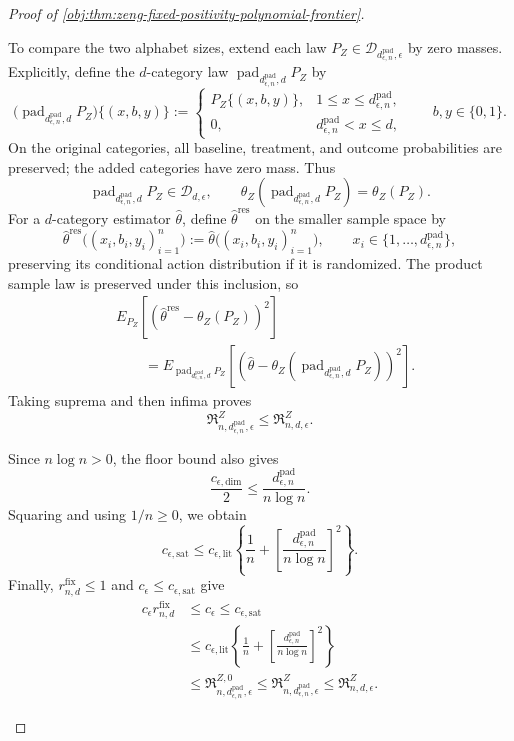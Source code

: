\documentclass[11pt]{article}
\begin{document}
\begin{proof}[Proof of \cref{obj:thm:zeng-fixed-positivity-polynomial-frontier}]
\begin{enumerate}
To compare the two alphabet sizes, extend each law
\(P_Z\in\mathcal D_{d_{\epsilon,n}^{\mathrm{pad}},\epsilon}\)
by zero masses. Explicitly, define the \(d\)-category law
\(\operatorname{pad}_{d_{\epsilon,n}^{\mathrm{pad}},d}P_Z\) by
\[
\bigl(\operatorname{pad}_{d_{\epsilon,n}^{\mathrm{pad}},d}P_Z\bigr)
\{(x,b,y)\}
:=
\begin{cases}
P_Z\{(x,b,y)\},&1\le x\le d_{\epsilon,n}^{\mathrm{pad}},\\
0,&d_{\epsilon,n}^{\mathrm{pad}}<x\le d,
\end{cases}
\qquad b,y\in\{0,1\}.
\]
On the original categories, all baseline, treatment, and outcome
probabilities are preserved; the added categories have zero mass.
Thus
\[
\operatorname{pad}_{d_{\epsilon,n}^{\mathrm{pad}},d}P_Z
\in\mathcal D_{d,\epsilon},
\qquad
\theta_Z\!\left(
\operatorname{pad}_{d_{\epsilon,n}^{\mathrm{pad}},d}P_Z
\right)
=\theta_Z(P_Z).
\]
For a \(d\)-category estimator \(\widehat\theta\), define
\(\widehat\theta^{\mathrm{res}}\) on the smaller sample space by
\[
\widehat\theta^{\mathrm{res}}
\bigl((x_i,b_i,y_i)_{i=1}^n\bigr)
:=
\widehat\theta
\bigl((x_i,b_i,y_i)_{i=1}^n\bigr),
\qquad
x_i\in\{1,\ldots,d_{\epsilon,n}^{\mathrm{pad}}\},
\]
preserving its conditional action distribution if it is randomized.
The product sample law is preserved under this inclusion, so
\[
\begin{split}
&E_{P_Z}\!\left[
\left(\widehat\theta^{\mathrm{res}}-\theta_Z(P_Z)\right)^2
\right]\\
&\qquad=
E_{\operatorname{pad}_{d_{\epsilon,n}^{\mathrm{pad}},d}P_Z}
\!\left[
\left(
\widehat\theta-
\theta_Z\!\left(
\operatorname{pad}_{d_{\epsilon,n}^{\mathrm{pad}},d}P_Z
\right)
\right)^2
\right].
\end{split}
\]
Taking suprema and then infima proves
\[
\mathfrak R^Z_{n,d_{\epsilon,n}^{\mathrm{pad}},\epsilon}
\le
\mathfrak R^Z_{n,d,\epsilon}.
\]

Since \(n\log n>0\), the floor bound also gives
\[
\frac{c_{\epsilon,\mathrm{dim}}}{2}
\le
\frac{d_{\epsilon,n}^{\mathrm{pad}}}{n\log n}.
\]
Squaring and using \(1/n\ge0\), we obtain
\[
c_{\epsilon,\mathrm{sat}}
\le
c_{\epsilon,\mathrm{lit}}
\left\{
\frac1n+
\left[
\frac{d_{\epsilon,n}^{\mathrm{pad}}}{n\log n}
\right]^2
\right\}.
\]
Finally, \(r^{\mathrm{fix}}_{n,d}\le1\) and
\(c_\epsilon\le c_{\epsilon,\mathrm{sat}}\) give
\[
\begin{split}
c_\epsilon r^{\mathrm{fix}}_{n,d}
&\le c_\epsilon
\le c_{\epsilon,\mathrm{sat}}\\
&\le
c_{\epsilon,\mathrm{lit}}
\left\{
\frac1n+
\left[
\frac{d_{\epsilon,n}^{\mathrm{pad}}}{n\log n}
\right]^2
\right\}\\
&\le
\mathfrak R^{Z,0}_{n,d_{\epsilon,n}^{\mathrm{pad}},\epsilon}
\le
\mathfrak R^Z_{n,d_{\epsilon,n}^{\mathrm{pad}},\epsilon}
\le
\mathfrak R^Z_{n,d,\epsilon}.
\end{split}
\]


\end{enumerate}
\end{proof}
\end{document}
